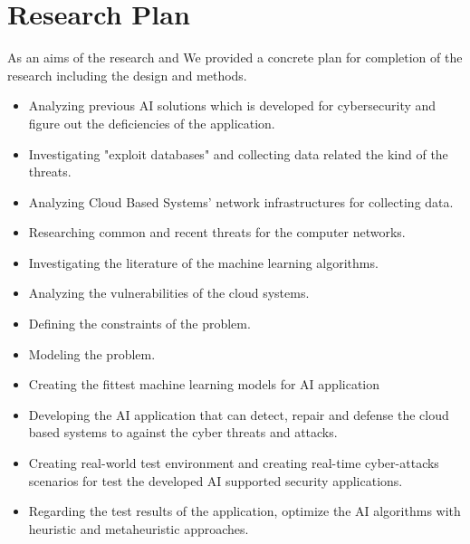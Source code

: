 \section{Research Plan}

 As an aims of the research and We provided a concrete plan for completion of the research including the design and methods. 

\begin{itemize}
    \item {
        Analyzing previous AI solutions which is developed for cybersecurity and figure out the deficiencies of the application. 
     }
    
     \item{
        Investigating "exploit databases" and collecting data related the kind of the threats.  
     }
     \item {
        Analyzing Cloud Based Systems' network infrastructures for collecting data. 
     }
    
     \item {
        Researching common and recent threats for the computer networks.
     }

     \item {
        Investigating the literature of the machine learning algorithms. 
    }
    \item {
        Analyzing the vulnerabilities of the cloud systems.   
    }

     \item {
        Defining the constraints of the problem.
     }

     \item {
        Modeling the problem. 
     }
     \item {
        Creating the fittest machine learning models for AI application 
     }
     \item {
        Developing the AI application that can detect, repair and defense the cloud based systems to against the cyber threats and attacks.
     }
    \item {
        Creating real-world test environment and creating real-time cyber-attacks scenarios for test the developed AI supported security applications.
    }

    \item {
        Regarding the test results of the application, optimize the AI algorithms with heuristic and metaheuristic approaches.  
    }

\end{itemize} 